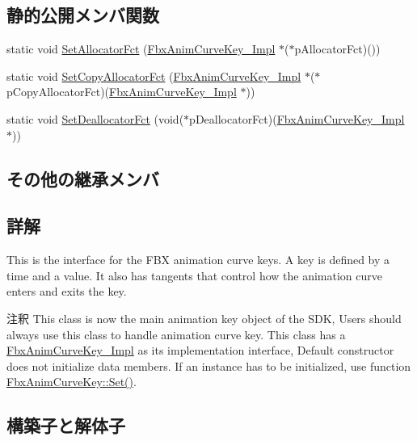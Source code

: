 \subsection*{静的公開メンバ関数}
\begin{DoxyCompactItemize}
\item 
static void \hyperlink{class_fbx_anim_curve_key_afa4c2dc0dd61a5f1bf28a1463b3ac859}{Set\+Allocator\+Fct} (\hyperlink{class_fbx_anim_curve_key___impl}{Fbx\+Anim\+Curve\+Key\+\_\+\+Impl} $\ast$($\ast$p\+Allocator\+Fct)())
\item 
static void \hyperlink{class_fbx_anim_curve_key_a39c27002f753b9f743c5883b0c0f6278}{Set\+Copy\+Allocator\+Fct} (\hyperlink{class_fbx_anim_curve_key___impl}{Fbx\+Anim\+Curve\+Key\+\_\+\+Impl} $\ast$($\ast$p\+Copy\+Allocator\+Fct)(\hyperlink{class_fbx_anim_curve_key___impl}{Fbx\+Anim\+Curve\+Key\+\_\+\+Impl} $\ast$))
\item 
static void \hyperlink{class_fbx_anim_curve_key_a340a84d3e66d6e679232954850414f9c}{Set\+Deallocator\+Fct} (void($\ast$p\+Deallocator\+Fct)(\hyperlink{class_fbx_anim_curve_key___impl}{Fbx\+Anim\+Curve\+Key\+\_\+\+Impl} $\ast$))
\end{DoxyCompactItemize}
\subsection*{その他の継承メンバ}


\subsection{詳解}
This is the interface for the F\+BX animation curve keys. A key is defined by a time and a value. It also has tangents that control how the animation curve enters and exits the key.

\begin{DoxyRemark}{注釈}
This class is now the main animation key object of the S\+DK, Users should always use this class to handle animation curve key. This class has a \hyperlink{class_fbx_anim_curve_key___impl}{Fbx\+Anim\+Curve\+Key\+\_\+\+Impl} as its implementation interface, Default constructor does not initialize data members. If an instance has to be initialized, use function \hyperlink{class_fbx_anim_curve_key_afdab5f0d38bedc7c4715aaa6a51d4370}{Fbx\+Anim\+Curve\+Key\+::\+Set()}. 
\end{DoxyRemark}


\subsection{構築子と解体子}
\mbox{\label{class_fbx_anim_curve_key_acc70533fb017bc71b617aaa37ee2e19f}} 
